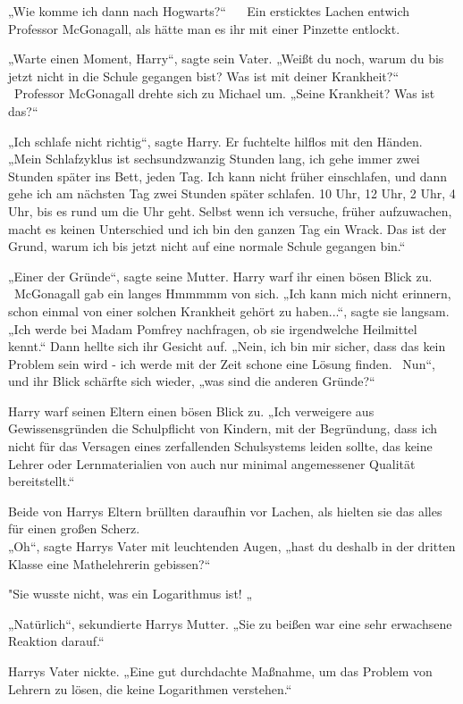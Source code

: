 {„Wie komme ich dann nach Hogwarts?“ ~ ~Ein ersticktes Lachen entwich Professor McGonagall, als hätte man es ihr mit einer Pinzette entlockt. ~ ~

„Warte einen Moment, Harry“, sagte sein Vater. „Weißt du noch, warum du bis jetzt nicht in die Schule gegangen bist? Was ist mit deiner Krankheit?“ ~ ~Professor McGonagall drehte sich zu Michael um. „Seine Krankheit? Was ist das?“ ~ ~

„Ich schlafe nicht richtig“, sagte Harry. Er fuchtelte hilflos mit den Händen. „Mein Schlafzyklus ist sechsundzwanzig Stunden lang, ich gehe immer zwei Stunden später ins Bett, jeden Tag. Ich kann nicht früher einschlafen, und dann gehe ich am nächsten Tag zwei Stunden später schlafen. 10 Uhr, 12 Uhr, 2 Uhr, 4 Uhr, bis es rund um die Uhr geht. Selbst wenn ich versuche, früher aufzuwachen, macht es keinen Unterschied und ich bin den ganzen Tag ein Wrack. Das ist der Grund, warum ich bis jetzt nicht auf eine normale Schule gegangen bin.“ ~ ~

„Einer der Gründe“, sagte seine Mutter. Harry warf ihr einen bösen Blick zu. ~ ~McGonagall gab ein langes Hmmmmm von sich. „Ich kann mich nicht erinnern, schon einmal von einer solchen Krankheit gehört zu haben...“, sagte sie langsam. „Ich werde bei Madam Pomfrey nachfragen, ob sie irgendwelche Heilmittel kennt.“ Dann hellte sich ihr Gesicht auf. „Nein, ich bin mir sicher, dass das kein Problem sein wird - ich werde mit der Zeit schone eine Lösung finden. ~Nun“, und ihr Blick schärfte sich wieder, „was sind die anderen Gründe?“ ~ ~

Harry warf seinen Eltern einen bösen Blick zu. „Ich verweigere aus Gewissensgründen die Schulpflicht von Kindern, mit der Begründung, dass ich nicht für das Versagen eines zerfallenden Schulsystems leiden sollte, das keine Lehrer oder Lernmaterialien von auch nur minimal angemessener Qualität bereitstellt.“ ~ ~

Beide von Harrys Eltern brüllten daraufhin vor Lachen, als hielten sie das alles für einen großen Scherz.\\ „Oh“, sagte Harrys Vater mit leuchtenden Augen, „hast du deshalb in der dritten Klasse eine Mathelehrerin gebissen?“ ~ ~

"Sie wusste nicht, was ein Logarithmus ist! „

„Natürlich“, sekundierte Harrys Mutter. „Sie zu beißen war eine sehr erwachsene Reaktion darauf.“ ~ ~

Harrys Vater nickte. „Eine gut durchdachte Maßnahme, um das Problem von Lehrern zu lösen, die keine Logarithmen verstehen.“ ~ ~

}
